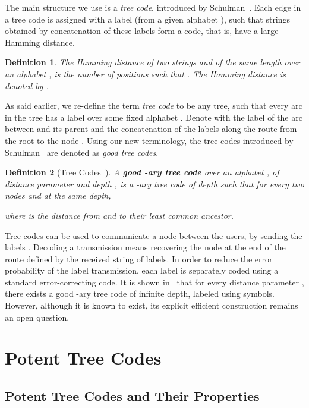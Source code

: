 \documentclass[ letterpaper, 11pt]{article}
\newtheorem{definition}{Definition}
\begin{document}
The main structure we use is a \emph{tree code}, introduced by Schulman~\cite{schulman93,schulman96}.
Each edge in a tree code is assigned with a label (from a given alphabet ),
such that strings obtained by concatenation of these labels
form a code, that is, have a large Hamming distance.

\begin{definition}
The Hamming distance of two strings  and
 of the same length over an alphabet ,
is the number of positions  such that .
The Hamming distance is denoted by .
\end{definition}

As said earlier, we re-define the term \emph{tree code} to be any tree, such that
every arc  in the tree has a label  over some fixed alphabet .
Denote with  the label of the arc between
 and its parent and  the concatenation of the labels along the
route from the root to the node . Using our new terminology,
the tree codes introduced by Schulman~\cite{schulman96}
are denoted as \emph{good tree codes}.
\begin{definition}[Tree Codes~\cite{schulman96}] \label{def:TreeCode}
A  \textbf{good -ary tree code} over an alphabet , of distance parameter  and depth ,
is a -ary tree code of depth  such that
for every two nodes  and  at the same depth,

where  is the distance from  and  to their least common ancestor.
\end{definition}
Tree codes can be used to communicate a node  between the users, by sending the labels
. Decoding a transmission means recovering the node at the end of
the route defined by the received string of labels.
In order to reduce the error probability of the label
transmission, each label is separately coded using a standard error-correcting code.
It is shown in~\cite{schulman96} that for every distance parameter , there exists a good -ary tree code of infinite depth, labeled using   symbols.
However, although it is known to exist, its explicit efficient construction
remains an open question.




\section{Potent Tree Codes}\label{sec:potent} 


\subsection{Potent Tree Codes and Their Properties}\label{sec:potent}
\end{document}
